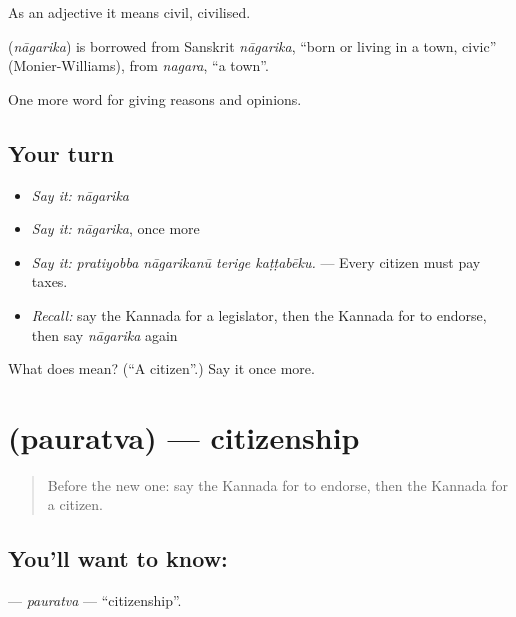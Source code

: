 As an adjective it means civil, civilised.

\begin{cousinweb}
\textbf{} (\emph{nāgarika}) is borrowed from Sanskrit \emph{nāgarika}, \textquotedblleft{}born or living in a town, civic\textquotedblright{} (Monier-Williams), from \emph{nagara}, \textquotedblleft{}a town\textquotedblright{}.
\end{cousinweb}

\begin{grammarlens}[title={What you've built}]
One more word for giving reasons and opinions.
\end{grammarlens}

\subsection*{Your turn}
\begin{itemize}
\raggedright
  \item \emph{Say it:} \emph{nāgarika}
  \item \emph{Say it:} \emph{nāgarika}, once more
  \item \emph{Say it:} \emph{pratiyobba nāgarikanū terige kaṭṭabēku.} — Every citizen must pay taxes.
  \item \emph{Recall:} say the Kannada for a legislator, then the Kannada for to endorse, then say \emph{nāgarika} again
\end{itemize}

\begin{tcolorbox}[breakable,colback=teal!4,colframe=teal!35!black,title={Before you move on}]
What does  mean? (\textquotedblleft{}A citizen\textquotedblright{}.) Say it once more.
\end{tcolorbox}
\section[\texorpdfstring{\kn{ಪೌರತ್ವ} (pauratva)}{ಪೌರತ್ವ (pauratva)}]{ (pauratva) — citizenship}

\label{lesson:KA-C397-pauratva}



\begin{quote}
Before the new one: say the Kannada for to endorse, then the Kannada for a citizen.
\end{quote}

\subsection*{You'll want to know: }
\textbf{} — \emph{pauratva} — \textquotedblleft{}citizenship\textquotedblright{}.

